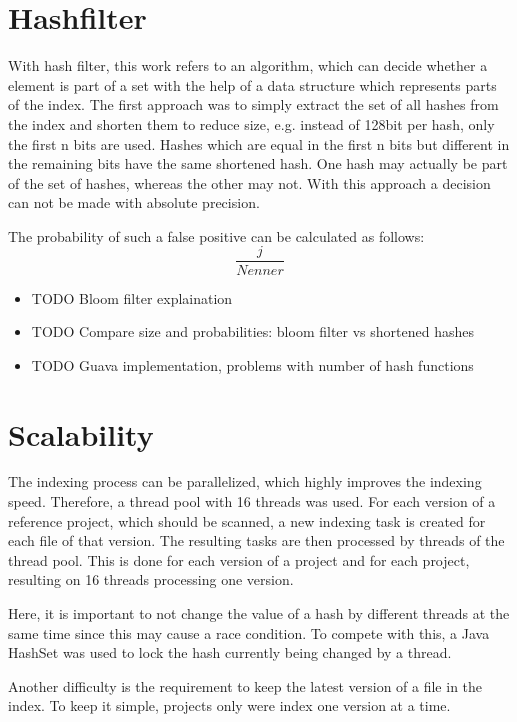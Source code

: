 \section{Hashfilter}\label{section:implementation/hashfilter}
With hash filter, this work refers to an algorithm, which can decide whether a element is part of a set with the help of a data structure which represents parts of the index.
The first approach was to simply extract the set of all hashes from the index and shorten them to reduce size, e.g. instead of 128bit per hash, only the first n bits are used.
Hashes which are equal in the first n bits but different in the remaining bits have the same shortened hash.
One hash may actually be part of the set of hashes, whereas the other may not.
With this approach a decision can not be made with absolute precision.

The probability of such a false positive can be calculated as follows:
\begin{equation}
	\frac{j}{Nenner}
\end{equation}

\begin{itemize}
	\item TODO Bloom filter explaination
	\item TODO Compare size and probabilities: bloom filter vs shortened hashes
	\item TODO Guava implementation, problems with number of hash functions
\end{itemize}

\section{Scalability}\label{section:implementation/scalability}
The indexing process can be parallelized, which highly improves the indexing speed.
Therefore, a thread pool with 16 threads was used.
For each version of a reference project, which should be scanned, a new indexing task is created for each file of that version.
The resulting tasks are then processed by threads of the thread pool.
This is done for each version of a project and for each project, resulting on 16 threads processing one version.

Here, it is important to not change the value of a hash by different threads at the same time since this may cause a race condition.
To compete with this, a Java HashSet was used to lock the hash currently being changed by a thread.

Another difficulty is the requirement to keep the latest version of a file in the index.
To keep it simple, projects only were index one version at a time.

